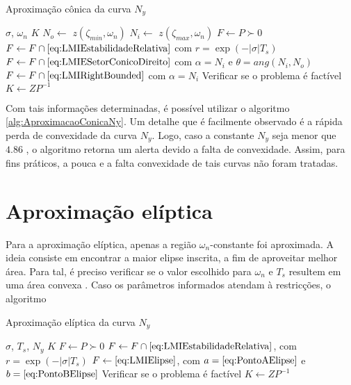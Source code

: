 \begin{algorithm}[hb!]
  \caption{Aproximação cônica da curva $N_y$}\label{alg:AproximacaoConicaNy}
  \begin{algorithmic}[1]
    \Require $\sigma$, $\omega_n$
    \Ensure $K$
    \State $N_o \gets $ $z(\zeta_{min},\omega_n)$
    \State $N_i \gets $ $z(\zeta_{max},\omega_n)$
    \State $F \gets P \succ 0$
    \State $F \gets F \cap \eqref{eq:LMIEstabilidadeRelativa}$ com $r = \exp{\left(-|\sigma|T_s\right)}$ 
    \State $F \gets F \cap \eqref{eq:LMIESetorConicoDireito}$ com $\alpha = N_i$ e $\theta = ang(N_i,N_o)$ 
    \State $F \gets F \cap \eqref{eq:LMIRightBounded}$ com $\alpha = N_i$ 
    \State Verificar se o problema é factível
    \State $K \gets ZP^{-1}$
  \end{algorithmic}
\end{algorithm}

Com tais informações determinadas, é possível utilizar o algoritmo \ref{alg:AproximacaoConicaNy}. Um detalhe que é facilmente observado é a rápida perda de convexidade da curva $N_y$. Logo, caso a constante $N_y$ seja menor que $4.86$ \cite{CHIQUETO2021}, o algoritmo retorna um alerta devido a falta de convexidade. Assim, para fins práticos, a pouca e a falta convexidade de tais curvas não foram tratadas.

\section{Aproximação elíptica}
Para a aproximação elíptica, apenas a região $\omega_n$-constante foi aproximada. A ideia consiste em encontrar a maior elipse inscrita, a fim de aproveitar melhor área. Para tal, é preciso verificar se o valor escolhido para $\omega_n$ e $T_s$ resultem em uma área convexa \cite{CHIQUETO2021}. Caso os parâmetros informados atendam à restricções, o algoritmo

\begin{figure}[!ht]
  \centering
  
  \caption{}
  \label{fig:AproximacaoEliptica}
\end{figure}

\begin{algorithm}[hb!]
  \caption{Aproximação elíptica da curva $N_y$}\label{alg:AproximacaoElipticaNy}
  \begin{algorithmic}[1]
    \Require $\sigma$, $T_s$, $N_y$
    \Ensure $K$
    \State $F \gets P \succ 0$
    \State $F \gets F \cap \eqref{eq:LMIEstabilidadeRelativa}$, com $r = \exp{\left(-|\sigma|T_s\right)}$ 
    \State $F \gets \eqref{eq:LMIElipse}$, com $a = \eqref{eq:PontoAElipse}$ e $b = \eqref{eq:PontoBElipse}$
    \State Verificar se o problema é factível
    \State $K \gets ZP^{-1}$
  \end{algorithmic}
\end{algorithm}

